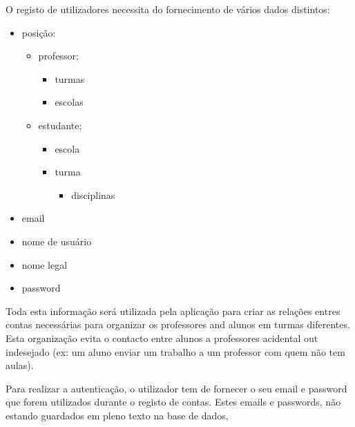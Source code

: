 \documentclass[10pt]{article}
\begin{document}
O registo de utilizadores necessita do fornecimento de vários dados distintos:
\begin{itemize}
    \item posição:
        \begin{itemize}
            \item professor;
                \begin{itemize}
                    \item turmas
                    \item escolas
                \end{itemize}
            \item estudante;
                \begin{itemize}
                    \item escola
                    \item turma
                        \begin{itemize}
                            \item disciplinas
                        \end{itemize}
                \end{itemize}
        \end{itemize}
    \item email
    \item nome de usuário
    \item nome legal
    \item password
\end{itemize}

Toda esta informação será utilizada pela aplicação para criar as relações
entres contas necessárias para organizar os professores and alunos em turmas
diferentes. Esta organização evita o contacto entre alunos a professores acidental
out indesejado (ex: um aluno enviar um trabalho a um professor com quem não tem aulas).

\newpage

Para realizar a autenticação, o utilizador tem de fornecer o seu email e password
que forem utilizados durante o registo de contas.
Estes emails e passwords, não estando guardados em pleno texto na base de dados,
\end{document}
